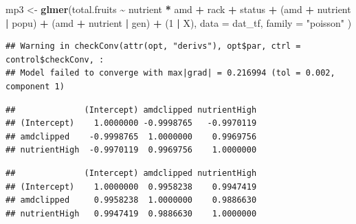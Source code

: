 \documentclass[
  12pt,
]{book}
\newenvironment{Shaded}{\begin{snugshade}}{\end{snugshade}}
\newcommand{\DataTypeTok}[1]{\textcolor[rgb]{0.13,0.29,0.53}{#1}}
\newcommand{\DecValTok}[1]{\textcolor[rgb]{0.00,0.00,0.81}{#1}}
\newcommand{\KeywordTok}[1]{\textcolor[rgb]{0.13,0.29,0.53}{\textbf{#1}}}
\newcommand{\NormalTok}[1]{#1}
\newcommand{\OperatorTok}[1]{\textcolor[rgb]{0.81,0.36,0.00}{\textbf{#1}}}
\newcommand{\StringTok}[1]{\textcolor[rgb]{0.31,0.60,0.02}{#1}}
\begin{document}
\begin{Shaded}
\begin{Highlighting}[]
\NormalTok{mp3 \textless{}{-}}\StringTok{ }\KeywordTok{glmer}\NormalTok{(total.fruits }\OperatorTok{\textasciitilde{}}\StringTok{ }\NormalTok{nutrient }\OperatorTok{*}\StringTok{ }\NormalTok{amd }\OperatorTok{+}
\StringTok{  }\NormalTok{rack }\OperatorTok{+}\StringTok{ }\NormalTok{status }\OperatorTok{+}
\StringTok{  }\NormalTok{(amd }\OperatorTok{+}\StringTok{ }\NormalTok{nutrient }\OperatorTok{|}\StringTok{ }\NormalTok{popu) }\OperatorTok{+}
\StringTok{  }\NormalTok{(amd }\OperatorTok{+}\StringTok{ }\NormalTok{nutrient }\OperatorTok{|}\StringTok{ }\NormalTok{gen) }\OperatorTok{+}\StringTok{ }\NormalTok{(}\DecValTok{1} \OperatorTok{|}\StringTok{ }\NormalTok{X),}
\DataTypeTok{data =}\NormalTok{ dat\_tf, }\DataTypeTok{family =} \StringTok{"poisson"}
\NormalTok{)}
\end{Highlighting}
\end{Shaded}

\begin{verbatim}
## Warning in checkConv(attr(opt, "derivs"), opt$par, ctrl = control$checkConv, :
## Model failed to converge with max|grad| = 0.216994 (tol = 0.002, component 1)
\end{verbatim}

\begin{Shaded}
\end{Shaded}

\begin{verbatim}
##              (Intercept) amdclipped nutrientHigh
## (Intercept)    1.0000000 -0.9998765   -0.9970119
## amdclipped    -0.9998765  1.0000000    0.9969756
## nutrientHigh  -0.9970119  0.9969756    1.0000000
\end{verbatim}

\begin{Shaded}
\end{Shaded}

\begin{verbatim}
##              (Intercept) amdclipped nutrientHigh
## (Intercept)    1.0000000  0.9958238    0.9947419
## amdclipped     0.9958238  1.0000000    0.9886630
## nutrientHigh   0.9947419  0.9886630    1.0000000
\end{verbatim}
\end{document}
